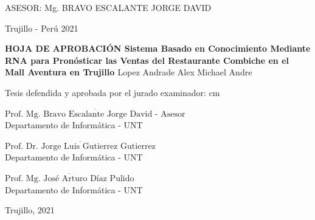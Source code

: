 \vskip 3.2cm
\begin{center}
   {\bf \doublespacing {\fontsize{17}{20.4}\selectfont{SISTEMA BASADO EN CONOCIMIENTO MEDIANTE RNA PARA PRONÓSTICAR LAS VENTAS  DEL RESTAURANTE COMBICHE EN EL MALL AVENTURA EN TRUJILLO }}}     
\end{center}   
  \vskip 2cm
\begin{verse}
 \fontsize{12}{14.4}
\end{verse}
%
\vskip 1.5cm 
{\fontsize{14}{16.8}\selectfont ASESOR: Mg. BRAVO ESCALANTE JORGE DAVID} 
 \vskip 1cm 
 \begin{center}    
 \vskip 2cm
{\fontsize{14}{16.8}\selectfont Trujillo - Perú
\vskip 0.2cm
\hspace*{-0.2cm} 
2021}
\end{center} 
\newpage
%
\begin{center}
 {\bf {\Large HOJA DE APROBACIÓN }     
 \vskip 1.5cm
  {\Large Sistema Basado en Conocimiento Mediante RNA para Pronósticar las Ventas del Restaurante Combiche en el Mall Aventura en Trujillo }}
 \vskip 1cm 
  \large{Lopez Andrade Alex Michael Andre}
 \vskip 1cm
\end{center} 
Tesis defendida y aprobada por el jurado examinador:
 cm
\begin{flushleft} 
$\overline{\mbox{Prof. Mg. Bravo Escalante Jorge David - Asesor}}$\\
\vskip -0.5cm
Departamento de Informática - UNT
\end{flushleft} 
\vskip 1cm
\begin{flushleft} 
$\overline{\mbox{Prof. Dr. Jorge Luis Gutierrez Gutierrez}}$\\
\vskip -0.5cm
Departamento de Informática - UNT
\end{flushleft} 
\vskip 1cm
\begin{flushleft} 
$\overline{\mbox{Prof. Mg. José Arturo Díaz Pulido}}$\\
\vskip -0.5cm
Departamento de Informática - UNT
\end{flushleft}
\vskip 0.8cm 
\begin{center}    
Trujillo, 2021
\end{center} 
\newpage

